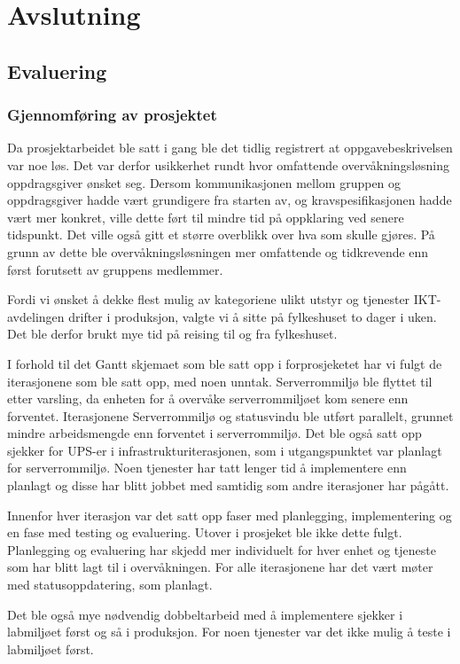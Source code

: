 \chapter{Avslutning}
\section{Evaluering}
\subsection{Gjennomføring av prosjektet}
Da prosjektarbeidet ble satt i gang ble det tidlig registrert at oppgavebeskrivelsen var noe løs. Det var derfor usikkerhet rundt hvor omfattende overvåkningsløsning oppdragsgiver ønsket seg. Dersom kommunikasjonen mellom gruppen og oppdragsgiver hadde vært grundigere fra starten av, og kravspesifikasjonen hadde vært mer konkret, ville dette ført til mindre tid på oppklaring ved senere tidspunkt. Det ville også gitt et større overblikk over hva som skulle gjøres. På grunn av dette ble overvåkningsløsningen mer omfattende og tidkrevende enn først forutsett av gruppens medlemmer.

Fordi vi ønsket å dekke flest mulig av kategoriene ulikt utstyr og tjenester IKT-avdelingen drifter i produksjon, valgte vi å sitte på fylkeshuset to dager i uken. Det ble derfor brukt mye tid på reising til og fra fylkeshuset.

I forhold til det Gantt skjemaet som ble satt opp i forprosjeketet har vi fulgt de iterasjonene som ble satt opp, med noen unntak. Serverrommiljø ble flyttet til etter varsling, da enheten for å overvåke serverrommiljøet kom senere enn forventet. Iterasjonene Serverrommiljø og statusvindu ble utført parallelt, grunnet mindre arbeidsmengde enn forventet i serverrommiljø. Det ble også satt opp sjekker for UPS-er i infrastrukturiterasjonen, som i utgangspunktet var planlagt for serverrommiljø. Noen tjenester har tatt lenger tid å implementere enn planlagt og disse har blitt jobbet med samtidig som andre iterasjoner har pågått.

Innenfor hver iterasjon var det satt opp faser med planlegging, implementering og en fase med testing og evaluering. Utover i prosjeket ble ikke dette fulgt. Planlegging og evaluering har skjedd mer individuelt for hver enhet og tjeneste som har blitt lagt til i overvåkningen. For alle iterasjonene har det vært møter med statusoppdatering, som planlagt. 

Det ble også mye nødvendig dobbeltarbeid med å implementere sjekker i labmiljøet først og så i produksjon. For noen tjenester var det ikke mulig å teste i labmiljøet først.

